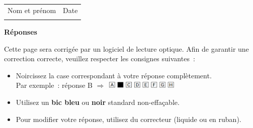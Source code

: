 \AMCformBegin{}%
\textbf{\thesubtitle{}\hfill\thetitle{}}

\vspace{1em}

\begin{tabular}{@{}ll@{}}
	\small{Nom et prénom}                                                            &
	\small{Date}                                                                       \\
	\namefield{\fbox{\begin{minipage}{.57\linewidth}%
				                 \vspace{1cm}\namefielddots{}%
				                 \vspace*{1mm}%
			                 \end{minipage}}} &
	\fbox{\begin{minipage}{.37\linewidth}%
			      \vspace{1cm}\dotfill{}%
			      \vspace*{1mm}%
		      \end{minipage}}
\end{tabular}

\vspace{1em}

\textbf{\Large{Réponses}}

\vspace{1em}

Cette page sera corrigée par un logiciel de lecture optique.
Afin de garantir une correction correcte, veuillez respecter les consignes suivantes~:

\begin{itemize}[noitemsep]
	\item	Noircissez la case correspondant à votre réponse complètement. \\
	      Par exemple~: réponse B \(\Rightarrow \) \includegraphics[width=3.5cm]{EncodageQCM.png}
	\item Utilisez un \textbf{bic bleu} ou \textbf{noir} standard non-effaçable.
	\item Pour modifier votre réponse, utilisez du correcteur (liquide ou en ruban).
\end{itemize}

\AMCform{}
